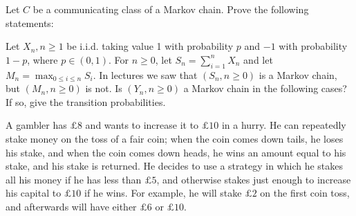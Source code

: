 \documentclass[answers]{exam}
\begin{document}
\begin{questions}
\question%
Let $C$ be a communicating class of a Markov chain. Prove the following statements:



\question%
Let $X_{n}, n \geq 1$ be i.i.d. taking value 1 with probability $p$ and $-1$ with probability $1-p$, where $p \in(0,1)$. For $n \geq 0$, let $S_{n}=\sum_{i=1}^{n} X_{n}$ and let $M_{n}=\max _{0 \leq i \leq n} S_{i}$. In lectures we saw that $\left(S_{n}, n \geq 0\right)$ is a Markov chain, but $(M_{n}, n \geq 0)$ is not. Is $(Y_{n}, n \geq 0)$ a Markov chain in the following cases? If so, give the transition probabilities.



\question%
A gambler has $\pounds 8$ and wants to increase it to $\pounds 10$ in a hurry. He can repeatedly stake money on the toss of a fair coin; when the coin comes down tails, he loses his stake, and when the coin comes down heads, he wins an amount equal to his stake, and his stake is returned. He decides to use a strategy in which he stakes all his money if he has less than $\pounds 5$, and otherwise stakes just enough to increase his capital to $\pounds 10$ if he wins. For example, he will stake $\pounds 2$ on the first coin toss, and afterwards will have either $\pounds 6$ or $\pounds 10$.
\begin{parts}

\end{parts}
\end{questions}
\end{document}
